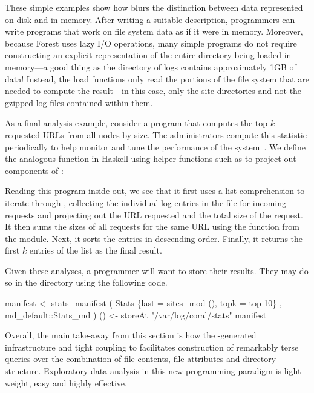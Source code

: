 These simple examples show how \forest{} blurs the distinction
between data represented on disk and in memory. After writing a
suitable \forest{} description, programmers can write programs that
work on file system data as if it were in memory. Moreover, because
Forest uses lazy I/O operations, many simple programs do not require
constructing an explicit representation of the entire directory being
loaded in memory---a good thing as the directory of \coral{} logs
contains approximately 1GB of data!  Instead, the load functions only
read the portions of the file system that are needed to compute the
result---in this case, only the site directories and not the gzipped
log files contained within them.

As a final analysis example, consider a program that computes the top-$k$
requested URLs from all \coral{} nodes by size. The \coral{}
administrators compute this statistic periodically to help monitor and
tune the performance of the system~\cite{freedman:coral-experience}. 
We define the analogous function in Haskell using helper
functions such as  to project out components of
:
%
Reading this program inside-out, we see that it first uses a list
comprehension to iterate through , collecting the
individual log entries in the  file for
incoming requests and projecting out the URL requested and the total
size of the request. It then sums the sizes of all requests for the
same URL using the  function from the 
module. Next, it sorts the entries in descending order. Finally, it
returns the first $k$ entries of the list as the final result.

Given these analyses, a programmer will want to store their results.
They may do so in the  directory using the following code.

\begin{code}
manifest 
   <- stats_manifest 
        ( Stats \{last = sites_mod (), topk = top 10\}
        , md_default::Stats_md )
() <- storeAt "/var/log/coral/stats" manifest 
\end{code}

Overall, the main take-away from this section is how 
the \forest{}-generated infrastructure and tight coupling
to \haskell{} facilitates construction
of remarkably terse queries over the combination of file contents,
file attributes and directory structure.  Exploratory data analysis
in this new programming paradigm is light-weight, easy and highly effective.
